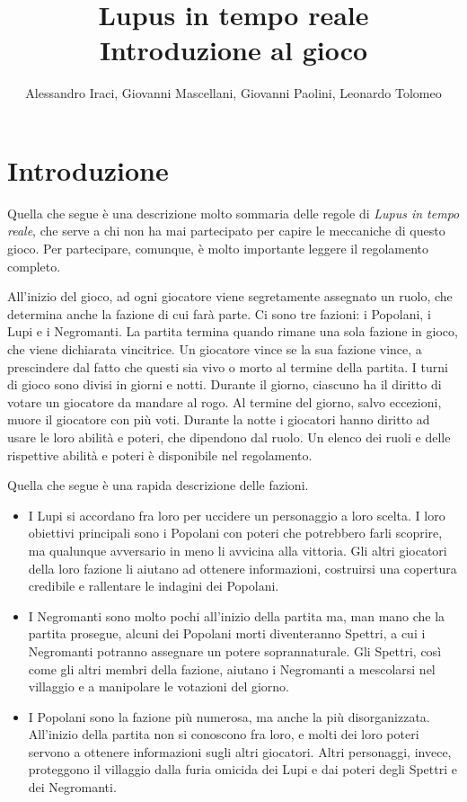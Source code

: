 \documentclass[a4paper,10pt]{article}
\title{Lupus in tempo reale\\ Introduzione al gioco}
\author{Alessandro Iraci, Giovanni Mascellani, Giovanni Paolini, Leonardo Tolomeo}
\begin{document}
\maketitle

\section{Introduzione}

Quella che segue è una descrizione molto sommaria delle regole di \emph{Lupus in tempo reale}, che serve a chi non ha mai partecipato per capire le meccaniche di questo gioco. Per partecipare, comunque, è molto importante leggere il regolamento completo.

All'inizio del gioco, ad ogni giocatore viene segretamente assegnato un ruolo, che determina anche la fazione di cui farà parte. Ci sono tre fazioni: i Popolani, i Lupi e i Negromanti. La partita termina quando rimane una sola fazione in gioco, che viene dichiarata vincitrice. Un giocatore vince se la sua fazione vince, a prescindere dal fatto che questi sia vivo o morto al termine della partita.
I turni di gioco sono divisi in giorni e notti. Durante il giorno, ciascuno ha il diritto di votare un giocatore da mandare al rogo. Al termine del giorno, salvo eccezioni, muore il giocatore con più voti. Durante la notte i giocatori hanno diritto ad usare le loro abilità e poteri, che dipendono dal ruolo. Un elenco dei ruoli e delle rispettive abilità e poteri è disponibile nel regolamento.

Quella che segue è una rapida descrizione delle fazioni.

\begin{itemize}
 \item I Lupi si accordano fra loro per uccidere un personaggio a loro scelta. I loro obiettivi principali sono i Popolani con poteri che potrebbero farli scoprire, ma qualunque avversario in meno li avvicina alla vittoria. Gli altri giocatori della loro fazione li aiutano ad ottenere informazioni, costruirsi una copertura credibile e rallentare le indagini dei Popolani.
 \item I Negromanti sono molto pochi all'inizio della partita ma, man mano che la partita prosegue, alcuni dei Popolani morti diventeranno Spettri, a cui i Negromanti potranno assegnare un potere soprannaturale. Gli Spettri, così come gli altri membri della fazione, aiutano i Negromanti a mescolarsi nel villaggio e a manipolare le votazioni del giorno.
 \item I Popolani sono la fazione più numerosa, ma anche la più disorganizzata. All'inizio della partita non si conoscono fra loro, e molti dei loro poteri servono a ottenere informazioni sugli altri giocatori. Altri personaggi, invece, proteggono il villaggio dalla furia omicida dei Lupi e dai poteri degli Spettri e dei Negromanti.
\end{itemize}
\end{document}
